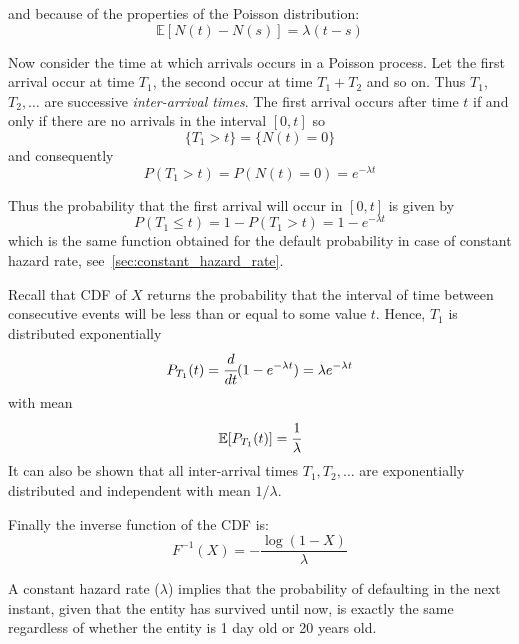 and because of the properties of the Poisson distribution:
\begin{equation}
\mathbb{E}[N(t)-N(s)]=\lambda (t-s)
\end{equation}

Now consider the time at which arrivals occurs in a Poisson process. Let the first arrival occur at time $T_1$, the second occur at time $T_1 + T_2$ and so on. Thus $T_1$, $T_2, \ldots$ are successive \emph{inter-arrival times}. The first arrival occurs after time $t$ if and only if there are no arrivals in the interval $[0,t]$ so 
\begin{equation}
\{T_1>t\}=\{N(t)=0\}
\end{equation}
and consequently
\begin{equation}
P(T_1>t)=P(N(t)=0)=e^{-\lambda t}
\end{equation}

Thus the probability that the first arrival will occur in $[0,t]$ is given by
\begin{equation}
P(T_1\le t)= 1-P(T_1>t)=1-e^{-\lambda t}
\end{equation}
which is the same function obtained for the default probability in case of constant hazard rate, see~\ref{sec:constant_hazard_rate}.

Recall that CDF of $X$ returns the probability that the interval of time between consecutive events will be less than or equal to some value $t$.
Hence, $T_1$ is distributed exponentially
\begin{equation}
P_{T_1}(t) = \cfrac{d}{dt}(1-e^{-\lambda t}) = \lambda e^{-\lambda t}
\end{equation}
with mean  
\begin{equation}
\mathbb{E}[P_{T_1}(t)] = \cfrac{1}{\lambda}
\end{equation}
It can also be shown that all inter-arrival times $T_1, T_2,\ldots$ are exponentially distributed and independent with mean $1/\lambda$.

Finally the inverse function of the CDF is:
\begin{equation}
F^{-1}(X) = -\frac{\log(1-X)}{\lambda}
\end{equation}

A constant hazard rate ($\lambda$) implies that the probability of defaulting in the next instant, given that the entity has survived until now, is exactly the same regardless of whether the entity is 1 day old or 20 years old.

